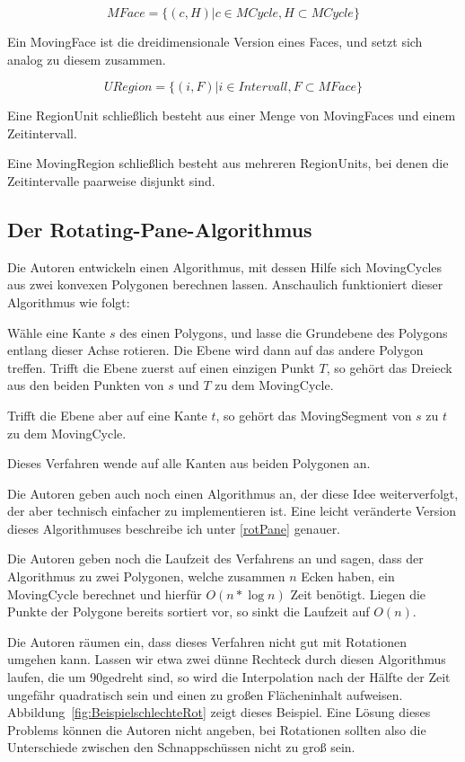 $$MFace=\{(c,H)|c\in MCycle, H\subset MCycle\}$$

Ein MovingFace ist die dreidimensionale Version eines Faces, und setzt sich analog zu diesem zusammen.

$$URegion=\{(i,F)|i\in Intervall, F\subset MFace\}$$

Eine RegionUnit schließlich besteht aus einer Menge von MovingFaces und einem Zeitintervall. 

Eine MovingRegion schließlich besteht aus mehreren RegionUnits, bei denen die Zeitintervalle paarweise disjunkt sind.

\subsection{Der Rotating-Pane-Algorithmus}

Die Autoren entwickeln einen Algorithmus, mit dessen Hilfe sich MovingCycles aus zwei konvexen Polygonen berechnen lassen. Anschaulich funktioniert dieser Algorithmus wie folgt:

Wähle eine Kante $s$ des einen Polygons, und lasse die Grundebene des Polygons entlang dieser Achse rotieren. Die Ebene wird dann auf das andere Polygon treffen. Trifft die Ebene zuerst auf einen einzigen Punkt $T$, so gehört das Dreieck aus den beiden Punkten von $s$ und $T$ zu dem MovingCycle.

Trifft die Ebene aber auf eine Kante $t$, so gehört das MovingSegment von $s$ zu $t$ zu dem MovingCycle.

Dieses Verfahren wende auf alle Kanten aus beiden Polygonen an.

Die Autoren geben auch noch einen Algorithmus an, der diese Idee weiterverfolgt, der aber technisch einfacher zu implementieren ist. Eine leicht veränderte Version dieses Algorithmuses beschreibe ich unter \ref{rotPane} genauer.

Die Autoren geben noch die Laufzeit des Verfahrens an und sagen, dass der Algorithmus zu zwei Polygonen, welche zusammen $n$ Ecken haben, ein MovingCycle berechnet und hierfür $O(n*\log{n})$ Zeit benötigt. Liegen die Punkte der Polygone bereits sortiert vor, so sinkt die Laufzeit auf $O(n)$.

Die Autoren räumen ein, dass dieses Verfahren nicht gut mit Rotationen umgehen kann. Lassen wir etwa zwei dünne Rechteck durch diesen Algorithmus laufen, die um 90\degree gedreht sind, so wird die Interpolation nach der Hälfte der Zeit ungefähr quadratisch  sein und einen zu großen Flächeninhalt aufweisen. Abbildung~\ref{fig:BeispielschlechteRot} zeigt dieses Beispiel. Eine Lösung dieses Problems können die Autoren nicht angeben, bei Rotationen sollten also die Unterschiede zwischen den Schnappschüssen nicht zu groß sein.

